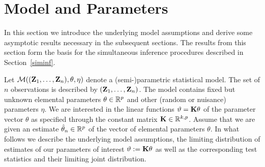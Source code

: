 \documentclass[12pt,a4paper]{article}
\begin{document}
\section{Model and Parameters}

\label{model}

In this section we introduce the underlying model assumptions and derive
some asymptotic results necessary in the subsequent sections. The results
from this section form the basis for the simultaneous inference procedures
described in Section~\ref{siminf}.

Let $\mathcal{M}((\mathbf{Z}_1, \dots, \mathbf{Z}_n), \theta, \eta)$ denote a (semi-)parametric statistical
model. The set of $n$ observations is described by $(\mathbf{Z}_1, \dots, \mathbf{Z}_n)$. 
The model contains fixed but unknown elemental parameters $\theta
\in \mathbb{R}^p$ and other (random or nuisance) parameters $\eta$. We are
interested in the linear functions $\vartheta = \mathbf{K} \theta$ of the parameter vector 
$\theta$ as specified through the constant matrix $\mathbf{K} \in \mathbb{R}^{k, p}$.
Assume that we are given an estimate $\hat{\theta}_n \in \mathbb{R}^p$ of the
vector of elemental parameters $\theta$. In what follows we describe the underlying
model assumptions, the limiting distribution of estimates of our parameters of 
interest $\vartheta := \mathbf{K} \theta$ as well
as the corresponding test statistics and their limiting joint distribution.
\end{document}
